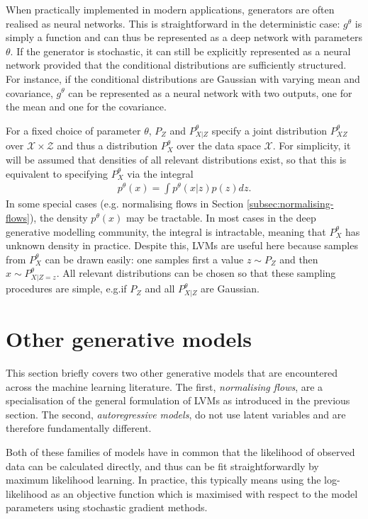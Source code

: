 When practically implemented in modern applications, generators are often realised as neural networks.
This is straightforward in the deterministic case: $g^\theta$ is simply a function and can thus be represented as a deep network with parameters $\theta$.
If the generator is stochastic, it can still be explicitly represented as a neural network provided that the conditional distributions are sufficiently structured. 
For instance, if the conditional distributions are Gaussian with varying mean and covariance, $g^\theta$ can be represented as a neural network with two outputs, one for the mean and one for the covariance.


For a fixed choice of parameter $\theta$, $P_Z$ and $P^\theta_{X|Z}$ specify a joint distribution $P^\theta_{XZ}$ over $\mathcal{X} \times \mathcal{Z}$ and thus a distribution $P_X^\theta$ over the data space $\mathcal{X}$. 
For simplicity, it will be assumed that densities of all relevant distributions exist, so that this is equivalent to specifying $P_X^\theta$ via the integral
%
\begin{align*}
p^\theta(x) = \int p^\theta(x|z) p(z) dz.
\end{align*}
%
In some special cases (e.g. normalising flows in Section \ref{subsec:normalising-flows}), the density $p^\theta(x)$ may be tractable.
In most cases in the deep generative modelling community, the integral is intractable, meaning that $P_X^\theta$ has unknown density in practice.
Despite this, LVMs are useful here because samples from $P_X^\theta$ can be drawn easily:
one samples first a value $z\sim P_Z$ and then $x \sim P^\theta_{X|Z=z}$. 
All relevant distributions can be chosen so that these sampling procedures are simple, e.g.\:if $P_Z$ and all $P^\theta_{X|Z}$ are Gaussian. 


\section{Other generative models}

This section briefly covers two other generative models that are encountered across the machine learning literature. The first, \emph{normalising flows}, are a specialisation of the general formulation of LVMs as introduced in the previous section. The second, \emph{autoregressive models}, do not use latent variables and are therefore fundamentally different. 

Both of these families of models have in common that the likelihood of observed data can be calculated directly, and thus can be fit straightforwardly by maximum likelihood learning. 
In practice, this typically means using the log-likelihood as an objective function which is maximised with respect to the model parameters using stochastic gradient methods.

